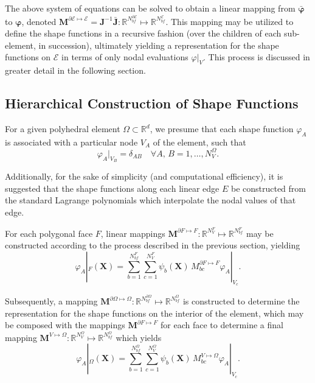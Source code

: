 	The above system of equations can be solved to obtain a linear mapping from $\bar{\boldsymbol{\varphi}}$ to $\boldsymbol{\varphi}$, denoted $\mathbf{M}^{\partial \mathcal{E} \mapsto \mathcal{E}} = \mathbf{J}^{-1} \bar{\mathbf{J}} : \mathbb{R}^{N^{\partial \mathcal{E}}_{bf}} \mapsto \mathbb{R}^{N^{\mathcal{E}}_{bf}}$. This mapping may be utilized to define the shape functions in a recursive fashion (over the children of each sub-element, in succession), ultimately yielding a representation for the shape functions on $\mathcal{E}$ in terms of only nodal evaluations $\varphi|_{V}$. This process is discussed in greater detail in the following section.
	
\subsection*{Hierarchical Construction of Shape Functions}

	For a given polyhedral element $\Omega \subset \mathbb{R}^d$, we presume that each shape function $\varphi_A$ is associated with a particular node $V_A$ of the element, such that
	\begin{equation}
		\varphi_A |_{V_B} = \delta_{AB} \quad \forall A, \, B = 1, \ldots, N^{\Omega}_V.
	\end{equation}
	
	Additionally, for the sake of simplicity (and computational efficiency), it is suggested that the shape functions along each linear edge $E$ be constructed from the standard Lagrange polynomials which interpolate the nodal values of that edge.

	For each polygonal face $F$, linear mappings $\mathbf{M}^{\partial F \mapsto F} : \mathbb{R}^{N^{F}_{V}} \mapsto \mathbb{R}^{N^{F}_{bf}}$ may be constructed according to the process described in the previous section, yielding 
	\begin{equation}
		\varphi_A |_{F} (\mathbf{X}) = \sum_{b = 1}^{N^F_{bf}} \sum_{c = 1}^{N^F_{V}} \psi_b (\mathbf{X}) \, M^{\partial F \mapsto F}_{bc} \varphi_A |_{V_c}.
	\end{equation}

	Subsequently, a mapping $\mathbf{M}^{\partial \Omega \mapsto \Omega} : \mathbb{R}^{N^{\partial \Omega}_{bf}} \mapsto \mathbb{R}^{N^{\Omega}_{bf}}$ is constructed to determine the representation for the shape functions on the interior of the element, which may be composed with the mappings $\mathbf{M}^{\partial F \mapsto F}$ for each face to determine a final mapping $\mathbf{M}^{V \mapsto \Omega} : \mathbb{R}^{N^{\Omega}_{V}} \mapsto \mathbb{R}^{N^{\Omega}_{bf}}$ which yields
	\begin{equation}
		\varphi_A |_{\Omega} (\mathbf{X}) = \sum_{b = 1}^{N^\Omega_{bf}} \sum_{c = 1}^{N^\Omega_{V}} \psi_b (\mathbf{X}) \, M^{V \mapsto \Omega}_{bc} \varphi_A |_{V_c}.
		\label{eq:mapped_shape_functions}
	\end{equation}

